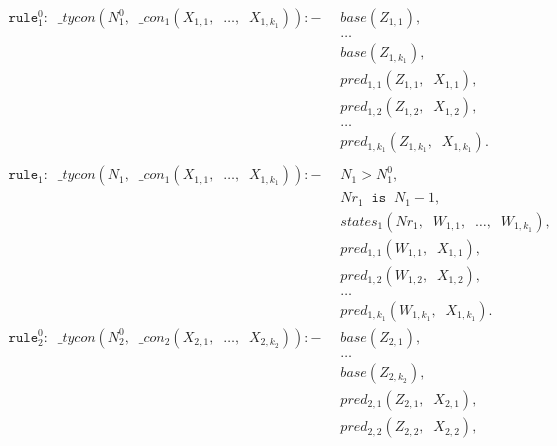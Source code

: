 \documentclass{report}
\theoremstyle{definition}
\theoremstyle{definition}
\newcommand{\ttt}[1]{\texttt{#1}}
\newcommand{\tav}{\;\;}
\begin{document}
\begin{align*}
	\ttt{rule}_{1}^{0}: \tav \_ tycon (N_{1}^{0}, \tav \_ con_1(X_{1,1}, \tav \ldots, \tav X_{1,k_1})) :-
	  & \tav base(Z_{1,1}),                                             &   &   \\
	  & \tav \ldots                                                     &   &   \\
	  & \tav base(Z_{1,k_1}),                                           &   &   \\
	  & \tav pred_{1, 1}(Z_{1,1}, \tav X_{1,1}),                        &   &   \\
	  & \tav pred_{1, 2}(Z_{1,2}, \tav X_{1,2}),                        &   &   \\
	  & \tav \ldots \tav                                                &   &   \\
	  & \tav pred_{1, k_1}(Z_{1,k_1}, \tav X_{1,k_1}).                  &   &   \\
	\\
	\ttt{rule}_1: \tav \_ tycon (N_1, \tav \_ con_1(X_{1,1}, \tav \ldots, \tav X_{1,k_1})) :-
	  & \tav N_1 > N_{1}^{0},                                           &   &   \\
	  & \tav Nr_1 \tav \ttt{is} \tav N_1 - 1,                           &   &   \\
	  & \tav states_1(Nr_1, \tav W_{1,1}, \tav \ldots, \tav W_{1,k_1}), &   &   \\
	  & \tav pred_{1, 1}(W_{1,1}, \tav X_{1,1}),                        &   &   \\
	  & \tav pred_{1, 2}(W_{1,2}, \tav X_{1,2}),                        &   &   \\
	  & \tav \ldots \tav                                                &   &   \\
	  & \tav pred_{1, k_1}(W_{1,k_1}, \tav X_{1,k_1}).                  &   &   \\
	\ttt{rule}_{2}^{0}: \tav \_ tycon (N_{2}^{0}, \tav \_ con_2(X_{2,1}, \tav \ldots, \tav X_{2,k_2})) :-
	  & \tav base(Z_{2,1}),                                             &   &   \\
	  & \tav \ldots                                                     &   &   \\
	  & \tav base(Z_{2,k_2}),                                           &   &   \\
	  & \tav pred_{2, 1}(Z_{2,1}, \tav X_{2,1}),                        &   &   \\
	  & \tav pred_{2, 2}(Z_{2,2}, \tav X_{2,2}),                        &   &   \\

\end{align*}
\end{document}
